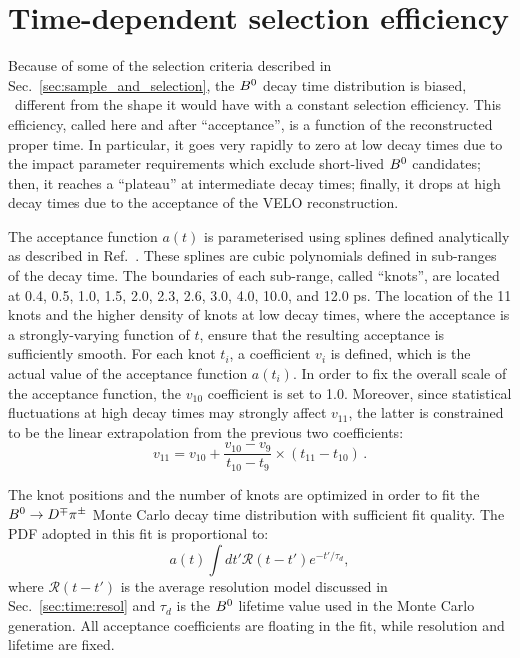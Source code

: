 \section{Time-dependent selection efficiency}
\label{sec:time:acc}

Because of some of the selection criteria described in Sec.~\ref{sec:sample_and_selection}, the $B^0$ decay time distribution is biased, \ie~different from the shape it would have with a constant selection efficiency. This efficiency, called here and after ``acceptance'', is a function of the reconstructed proper time. In particular, it goes very rapidly to zero at low decay times due to the impact parameter requirements which exclude short-lived $B^0$ candidates; then, it reaches a ``plateau'' at intermediate decay times; finally, it drops at high decay times due to the acceptance of the VELO reconstruction. 

The acceptance function $a(t)$ is parameterised using splines defined analytically as described in Ref.~\cite{spline}. These splines are cubic polynomials defined in sub-ranges of the decay time. The boundaries of each sub-range, called ``knots'', are located at 0.4, 0.5, 1.0, 1.5, 2.0, 2.3, 2.6, 3.0, 4.0, 10.0, and 12.0 ps. The location of the 11 knots and the higher density of knots at low decay times, where the acceptance is a strongly-varying function of $t$, ensure that the resulting acceptance is sufficiently smooth. For each knot $t_{i}$, a coefficient $v_{i}$ is defined, which is the actual value of the acceptance function $a(t_{i})$. In order to fix the overall scale of the acceptance function, the $v_{10}$ coefficient is set to 1.0. Moreover, since statistical fluctuations at high decay times may strongly affect $v_{11}$, the latter is constrained to be the linear extrapolation from the previous two coefficients:
\begin{equation}
	v_{11} = v_{10} + \frac{v_{10} - v_{9}}{t_{10}-t_{9}} \times (t_{11}-t_{10})\,.
\end{equation}     

The knot positions and the number of knots are optimized in order to fit the $B^0\rightarrow D^\mp\pi^\pm$ Monte Carlo decay time distribution with sufficient fit quality. The PDF adopted in this fit is proportional to: 
\begin{equation}
	a(t) \int dt' \mathcal R(t-t') e^{-t'/\tau_d},
\end{equation}
where $\mathcal R(t-t')$ is the average resolution model discussed in Sec.~\ref{sec:time:resol} and $\tau_d$ is the $B^0$ lifetime value used in the Monte Carlo generation. All acceptance coefficients are floating in the fit, while resolution and lifetime are fixed.

